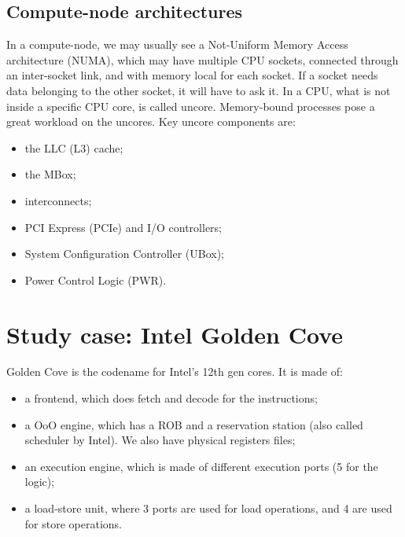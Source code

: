 \subsection{Compute-node architectures}

In a compute-node, we may usually see a Not-Uniform Memory Access architecture (NUMA), which may have multiple CPU sockets, connected through an inter-socket link, and with memory local for each socket. If a socket needs data belonging to the other socket, it will have to ask it.
\nwl
In a CPU, what is not inside a specific CPU core, is called uncore. Memory-bound processes pose a great workload on the uncores. Key uncore components are:
\begin{itemize}
    \item the LLC (L3) cache;
    \item the MBox;
    \item interconnects;
    \item PCI Express (PCIe) and I/O controllers;
    \item System Configuration Controller (UBox);
    \item Power Control Logic (PWR).
\end{itemize}

\section{Study case: Intel Golden Cove}

Golden Cove is the codename for Intel's 12th gen cores. It is made of:
\begin{itemize}
    \item a frontend, which does fetch and decode for the instructions;
    \item a OoO engine, which has a ROB and a reservation station (also called scheduler by Intel). We also have physical registers files;
    \item an execution engine, which is made of different execution ports (5 for the logic);
    \item a load-store unit, where 3 ports are used for load operations, and 4 are used for store operations.
\end{itemize}

